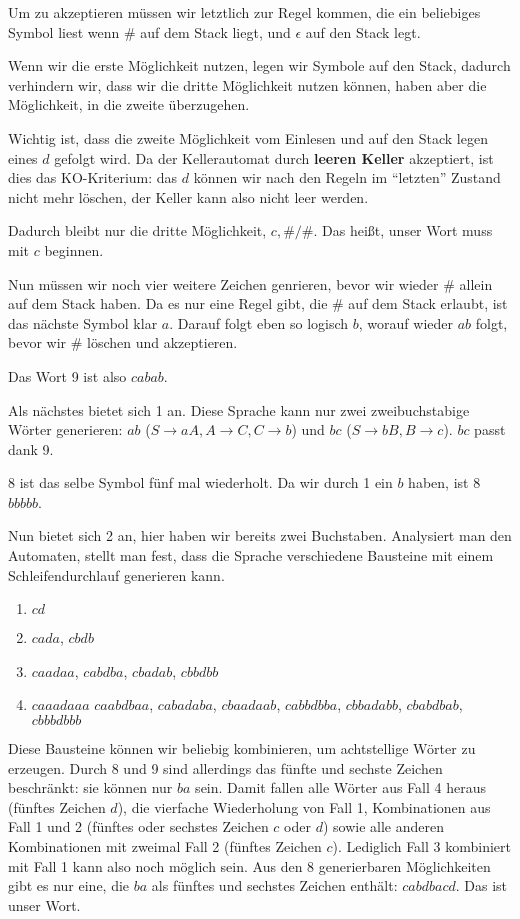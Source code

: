 \documentclass{article}
\begin{document}
Um zu akzeptieren müssen wir letztlich zur Regel kommen, die ein beliebiges Symbol liest wenn \# auf dem Stack liegt, und $\epsilon$ auf den Stack legt.

Wenn wir die erste Möglichkeit nutzen, legen wir Symbole auf den Stack, dadurch verhindern wir, dass wir die dritte Möglichkeit nutzen können, haben aber die Möglichkeit, in die zweite überzugehen.

Wichtig ist, dass die zweite Möglichkeit vom Einlesen und auf den Stack legen eines $d$ gefolgt wird. Da der Kellerautomat durch \textbf{leeren Keller} akzeptiert, ist dies das KO-Kriterium: das $d$ können wir nach den Regeln im ``letzten'' Zustand nicht mehr löschen, der Keller kann also nicht leer werden.

Dadurch bleibt nur die dritte Möglichkeit, $c,\#/\#$. Das heißt, unser Wort muss mit $c$ beginnen.

Nun müssen wir noch vier weitere Zeichen genrieren, bevor wir wieder \# allein auf dem Stack haben. Da es nur eine Regel gibt, die \# auf dem Stack erlaubt, ist das nächste Symbol klar $a$. Darauf folgt eben so logisch $b$, worauf wieder $ab$ folgt, bevor wir \# löschen und akzeptieren.

Das Wort 9 ist also $cabab$.

\bigskip

Als nächstes bietet sich 1 an. Diese Sprache kann nur zwei zweibuchstabige Wörter generieren: $ab$ ($S\rightarrow aA, A\rightarrow C, C\rightarrow b$) und $bc$ ($S\rightarrow bB, B\rightarrow c$). $bc$ passt dank 9.

\bigskip

8 ist das selbe Symbol fünf mal wiederholt. Da wir durch 1 ein $b$ haben, ist 8 $bbbbb$.

\bigskip

Nun bietet sich 2 an, hier haben wir bereits zwei Buchstaben.
Analysiert man den Automaten, stellt man fest, dass die Sprache verschiedene Bausteine mit einem Schleifendurchlauf generieren kann.
\begin{enumerate}
	\item $cd$
  \item $cada$, $cbdb$
  \item $caadaa$, $cabdba$, $cbadab$, $cbbdbb$
  \item $caaadaaa$ $caabdbaa$, $cabadaba$, $cbaadaab$, $cabbdbba$, $cbbadabb$, $cbabdbab$, $cbbbdbbb$
\end{enumerate}
Diese Bausteine können wir beliebig kombinieren, um achtstellige Wörter zu erzeugen. Durch 8 und 9 sind allerdings das fünfte und sechste Zeichen beschränkt: sie können nur $ba$ sein.
Damit fallen alle Wörter aus Fall 4 heraus (fünftes Zeichen $d$), die vierfache Wiederholung von Fall 1, Kombinationen aus Fall 1 und 2 (fünftes oder sechstes Zeichen $c$ oder $d$) sowie alle anderen Kombinationen mit zweimal Fall 2 (fünftes Zeichen $c$).
Lediglich Fall 3 kombiniert mit Fall 1 kann also noch möglich sein. Aus den 8 generierbaren Möglichkeiten gibt es nur eine, die $ba$ als fünftes und sechstes Zeichen enthält: $cabdbacd$. Das ist unser Wort.
\end{document}
